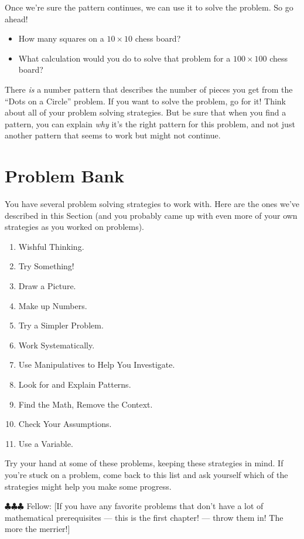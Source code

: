 \documentclass[10pt, reqno]{amsart}
\theoremstyle{remark}
\theoremstyle{definition}
\numberwithin{equation}{section}  %
\newcommand{\fellow}[1]{{\color{magenta} \sf $\clubsuit\clubsuit\clubsuit$ Fellow: [#1]}}
\begin{document}
Once we're sure the pattern continues, we can use it to solve the problem.  So go ahead!  
\begin{itemize}
\item
How many squares on a $10 \times 10$ chess board?    
\item
What calculation would you do to solve that problem for a $100 \times 100$ chess board?
\end{itemize}


There \emph{is} a number pattern that describes the number of pieces you get from the ``Dots on a Circle'' problem.  If you want to solve the problem, go for it!  Think about all of your problem solving strategies.  But be sure that when you find a pattern, you can explain \emph{why} it's the right pattern for this problem, and not just another pattern that seems to work but might not continue.


\section{Problem Bank}\label{sec:ProblemBank}
You have several problem solving strategies to work with.  Here are the ones we've described in this Section (and you probably came up with even more of your own strategies as you worked on problems).
\begin{enumerate}
\item
Wishful Thinking.
\item
Try Something!
\item
Draw a Picture.
\item
Make up Numbers.
\item
Try a Simpler Problem.
\item
Work Systematically.
\item
Use Manipulatives to Help You Investigate.
\item
Look for and Explain Patterns.
\item
Find the Math, Remove the Context.
\item
Check Your Assumptions.
\item
Use a Variable.
\end{enumerate}

Try your hand at some of these problems, keeping these strategies in mind.  If you're stuck on a problem, come back to this list and ask yourself which of the strategies might help you make some progress.


\fellow{If you have any favorite problems that don't have a lot of mathematical prerequisites --- this is the first chapter! --- throw them in!  The more the merrier!}
\end{document}
